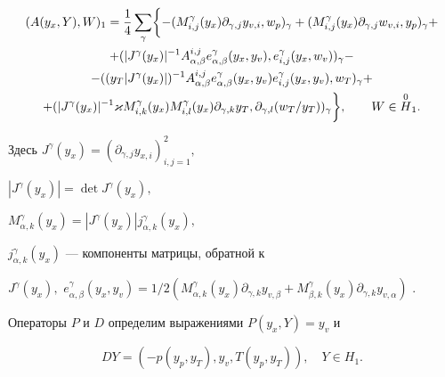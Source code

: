 \begin{gather} 


(A(y_x,Y),W)_1=\frac14 \sum_\gamma\biggl\{ 


-(M^\gamma_{i,j}(y_x)\partial_{\gamma,j}y_{v,i},w_p)_\gamma+ 


(M^\gamma_{i,j}(y_x)\partial_{\gamma,j}w_{v,i},y_p)_\gamma+\notag\\ 


%


+(|J^\gamma(y_x)|^{-1}A^{i,j}_{\alpha,\beta}e^\gamma_{\alpha,\beta} 


(y_x,y_v),e^\gamma_{i,j}(y_x,w_v))_\gamma- \notag \\ 


%


-((y_T|J^\gamma(y_x)|)^{-1}A^{i,j}_{\alpha,\beta} 


e^\gamma_{\alpha,\beta}(y_x,y_v)e^\gamma_{i,j}(y_x,y_v),w_T)_\gamma+\notag \\ 


%


+(|J^\gamma(y_x)|^{-1}\varkappa M^\gamma_{i,k}(y_x)M^\gamma_{i,l}(y_x) 


\partial_{\gamma,k}y_T,\partial_{\gamma,l}(w_T/y_T))_\gamma 


\biggr\},\qquad W\in \overset{0} H{}_1. 


\end{gather} 


Здесь $J^\gamma(y_x)=(\partial_{\gamma,j}y_{x,i})^2_{i,j=1},$ 


$|J^\gamma(y_x)|=\det J^\gamma(y_x),$ 


$M^\gamma_{\alpha,k}(y_x)=|J^\gamma(y_x)|j^\gamma_{\alpha,k}(y_x),$ 


$j^\gamma_{\alpha,k}(y_x)$ --- компоненты матрицы, обратной к  


$J^\gamma(y_x),$ $e^\gamma_{\alpha,\beta}(y_x,y_v)= 


1/2(M^\gamma_{\alpha,k}(y_x)\partial_{\gamma,k}y_{v,\beta}+ 


M^\gamma_{\beta,k}(y_x)\partial_{\gamma,k}y_{v,\alpha})$ .


 


Операторы $P$ и $D$ определим выражениями $P(y_x,Y)=y_v$ и 


\begin{equation} 


DY = (-p(y_p,y_T),y_v,T(y_p,y_T)),\quad Y\in H_1. 


\end{equation} 


